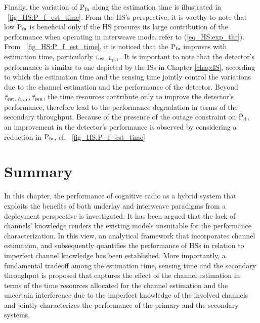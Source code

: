 Finally, the variation of $\text{P}_{\text{fa}}$ along the estimation time is illustrated in \figurename~\ref{fig_HS:P_f_est_time}. From the HS's perspective, it is worthy to note that low $\text{P}_{\text{fa}}$ is beneficial only if the HS procures its large contribution of the performance when operating in interweave mode, refer to (\ref{eq_HS:exp_thr}). From \figurename~\ref{fig_HS:P_f_est_time}, it is noticed that the $\text{P}_{\text{fa}}$ improves with estimation time, particularly $\tau_{\text{est, $h_{\text{p,1}}$}}$. It is important to note that the detector's performance is similar to one depicted by the ISs in Chapter \ref{chap:IS}, according to which the estimation time and the sensing time jointly control the variations due to the channel estimation and the performance of the detector. Beyond $\tilde{\tau}_{\text{est, $h_{\text{p,1}}$}}, \tilde{\tau}_{\text{sen}}$, the time resources contribute only to improve the detector's performance, therefore lead to the performance degradation in terms of the secondary throughput. Because of the presence of the outage constraint on $\hat{\text{P}}_{\text{d}}$, an improvement in the detector's performance is observed by considering a reduction in $\text{P}_{\text{fa}}$, cf. \figurename~\ref{fig_HS:P_f_est_time} 

\section{Summary} \label{sec_HS:conc}
In this chapter, the performance of cognitive radio as a hybrid system that exploits the benefits of both underlay and interweave paradigms from a deployment perspective is investigated. It has been argued that the lack of channels' knowledge renders the existing models unsuitable for the performance characterization. In this view, an analytical framework that incorporates channel estimation, and subsequently quantifies the performance of HSs in relation to imperfect channel knowledge has been established. More importantly, a fundamental tradeoff among the estimation time, sensing time and the secondary throughput is proposed that captures the effect of the channel estimation in terms of the time resources allocated for the channel estimation and the uncertain interference due to the imperfect knowledge of the involved channels and jointly characterizes the performance of the primary and the secondary systems. %

